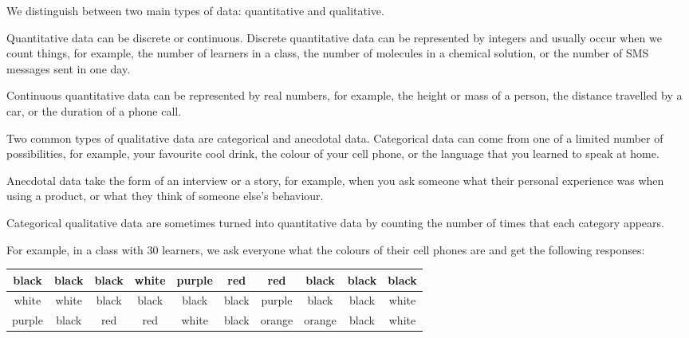 We distinguish between two main types of data: quantitative and
qualitative.


Quantitative data can be discrete or continuous. Discrete quantitative
data can be represented by integers and usually occur when we count
things, for example, the number of learners in a class, the number of
molecules in a chemical solution, or the number of SMS messages sent
in one day.\par

Continuous quantitative data can be represented by real numbers, for
example, the height or mass of a person, the distance travelled by a
car, or the duration of a phone call.


Two common types of qualitative data are categorical and anecdotal
data. Categorical data can come from one of a limited number of
possibilities, for example, your favourite cool drink, the colour of
your cell phone, or the language that you learned to speak at home.\par

Anecdotal data take the form of an interview or a story, for example,
when you ask someone what their personal experience was when using a
product, or what they think of someone else's behaviour.\par

Categorical qualitative data are sometimes turned into quantitative
data by counting the number of times that each category appears.\par

For example, in a class with $30$ learners, we ask everyone what the colours of
  their cell phones are and get the following responses:

  \begin{center}
    \begin{tabular}{|c|c|c|c|c|c|c|c|c|c|}\hline
     
      black & black & black & white & purple & red & red & black & black & black \\ \hline
      white & white & black & black & black & black & purple & black & black & white \\ \hline
      purple & black & red & red & white & black & orange & orange & black & white \\ \hline
     
    \end{tabular}
  \end{center}

